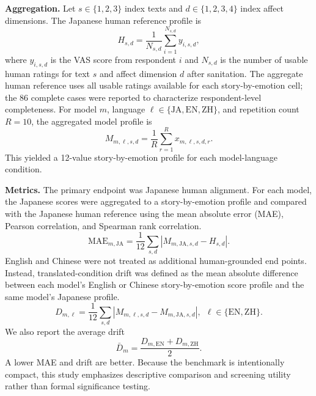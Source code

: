 \documentclass[conference,a4paper]{IEEEtran}
\begin{document}
\textbf{Aggregation.} Let $s \in \{1,2,3\}$ index texts and $d \in \{1,2,3,4\}$ index affect dimensions. The Japanese human reference profile is
\begin{equation}
H_{s,d}=\frac{1}{N_{s,d}}\sum_{i=1}^{N_{s,d}} y_{i,s,d},
\end{equation}
where $y_{i,s,d}$ is the VAS score from respondent $i$ and $N_{s,d}$ is the number of usable human ratings for text $s$ and affect dimension $d$ after sanitation. The aggregate human reference uses all usable ratings available for each story-by-emotion cell; the 86 complete cases were reported to characterize respondent-level completeness. For model $m$, language $\ell \in \{\mathrm{JA},\mathrm{EN},\mathrm{ZH}\}$, and repetition count $R=10$, the aggregated model profile is
\begin{equation}
M_{m,\ell,s,d}=\frac{1}{R}\sum_{r=1}^{R} x_{m,\ell,s,d,r}.
\end{equation}
This yielded a 12-value story-by-emotion profile for each model-language condition.

\textbf{Metrics.} The primary endpoint was Japanese human alignment. For each model, the Japanese scores were aggregated to a story-by-emotion profile and compared with the Japanese human reference using the mean absolute error (MAE), Pearson correlation, and Spearman rank correlation.
\begin{equation}
\mathrm{MAE}_{m,\mathrm{JA}}=\frac{1}{12}\sum_{s,d}\left|M_{m,\mathrm{JA},s,d}-H_{s,d}\right|.
\end{equation}
English and Chinese were not treated as additional human-grounded end points. Instead, translated-condition drift was defined as the mean absolute difference between each model's English or Chinese story-by-emotion score profile and the same model's Japanese profile.
\begin{equation}
D_{m,\ell}=\frac{1}{12}\sum_{s,d}\left|M_{m,\ell,s,d}-M_{m,\mathrm{JA},s,d}\right|,~~ \ell \in \{\mathrm{EN},\mathrm{ZH}\}.
\end{equation}
We also report the average drift
\begin{equation}
\bar{D}_m=\frac{D_{m,\mathrm{EN}}+D_{m,\mathrm{ZH}}}{2}.
\end{equation}
A lower MAE and drift are better. Because the benchmark is intentionally compact, this study emphasizes descriptive comparison and screening utility rather than formal significance testing.
\end{document}
